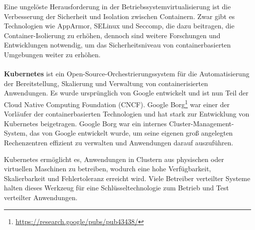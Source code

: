 \documentclass[../vs-script-first-v01.tex]{subfiles}
\begin{document}
Eine ungelöste Herausforderung in der Betriebssystemvirtualisierung ist die Verbesserung der Sicherheit und Isolation zwischen Containern. Zwar gibt es Technologien wie AppArmor, SELinux und Seccomp, die dazu beitragen, die Container-Isolierung zu erhöhen, dennoch sind weitere Forschungen und Entwicklungen notwendig, um das Sicherheitsniveau von containerbasierten Umgebungen weiter zu erhöhen.
\\\\
\textbf{Kubernetes} ist ein Open-Source-Orchestrierungssystem für die Automatisierung der Bereitstellung, Skalierung und Verwaltung von containerisierten Anwendungen. Es wurde ursprünglich von Google entwickelt und ist nun Teil der Cloud Native Computing Foundation (CNCF). Google Borg\footnote{\url{https://research.google/pubs/pub43438/}} war einer der Vorläufer der containerbasierten Technologien und hat stark zur Entwicklung von Kubernetes beigetragen.  Google Borg war ein internes Cluster-Management-System, das von Google entwickelt wurde, um seine eigenen groß angelegten Rechenzentren effizient zu verwalten und Anwendungen darauf auszuführen. 

Kubernetes ermöglicht es, Anwendungen in Clustern aus physischen oder virtuellen Maschinen zu betreiben, wodurch eine hohe Verfügbarkeit, Skalierbarkeit und Fehlertoleranz erreicht wird. Viele Betreiber verteilter Systeme halten dieses Werkzeug für eine Schlüsseltechnologie zum Betrieb und Test verteilter Anwendungen.
\end{document}
